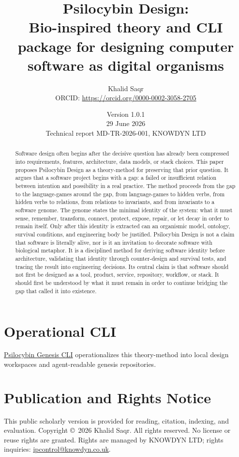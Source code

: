 \documentclass[11pt]{article}
\title{Psilocybin Design:\\Bio-inspired theory and CLI package for designing computer software as digital organisms}
\author{Khalid Saqr\\\small ORCID: \href{https://orcid.org/0000-0002-3058-2705}{https://orcid.org/0000-0002-3058-2705}}
\date{Version 1.0.1\\29 June 2026\\Technical report MD-TR-2026-001, KNOWDYN LTD}
\begin{document}
\maketitle

\section*{Operational CLI}
\href{../docs/cli.html}{Psilocybin Genesis CLI} operationalizes this theory-method into local design workspaces and agent-readable genesis repositories.

\begin{abstract}
Software design often begins after the decisive question has already been compressed into requirements, features, architecture, data models, or stack choices. This paper proposes Psilocybin Design as a theory-method for preserving that prior question. It argues that a software project begins with a gap: a failed or insufficient relation between intention and possibility in a real practice. The method proceeds from the gap to the language-games around the gap, from language-games to hidden verbs, from hidden verbs to relations, from relations to invariants, and from invariants to a software genome. The genome states the minimal identity of the system: what it must sense, remember, transform, connect, protect, expose, repair, or let decay in order to remain itself. Only after this identity is extracted can an organismic model, ontology, survival conditions, and engineering body be justified. Psilocybin Design is not a claim that software is literally alive, nor is it an invitation to decorate software with biological metaphor. It is a disciplined method for deriving software identity before architecture, validating that identity through counter-design and survival tests, and tracing the result into engineering decisions. Its central claim is that software should not first be designed as a tool, product, service, repository, workflow, or stack. It should first be understood by what it must remain in order to continue bridging the gap that called it into existence.
\end{abstract}


\section*{Publication and Rights Notice}
This public scholarly version is provided for reading, citation, indexing, and evaluation. Copyright \copyright\ 2026 Khalid Saqr. All rights reserved. No license or reuse rights are granted. Rights are managed by KNOWDYN LTD; rights inquiries: \href{mailto:ipcontrol@knowdyn.co.uk}{ipcontrol@knowdyn.co.uk}.
\end{document}
